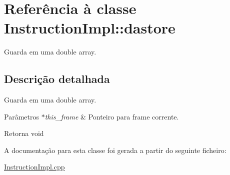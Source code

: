 \hypertarget{class_instruction_impl_1_1dastore}{}\section{Referência à classe Instruction\+Impl\+:\+:dastore}
\label{class_instruction_impl_1_1dastore}


Guarda em uma double array.  




\subsection{Descrição detalhada}
Guarda em uma double array. 


\begin{DoxyParams}{Parâmetros}
{\em $\ast$this\+\_\+frame} & Ponteiro para frame corrente. \\
\hline
\end{DoxyParams}
\begin{DoxyReturn}{Retorna}
void 
\end{DoxyReturn}


A documentação para esta classe foi gerada a partir do seguinte ficheiro\+:\begin{DoxyCompactItemize}
\item 
\hyperlink{_instruction_impl_8cpp}{Instruction\+Impl.\+cpp}\end{DoxyCompactItemize}
